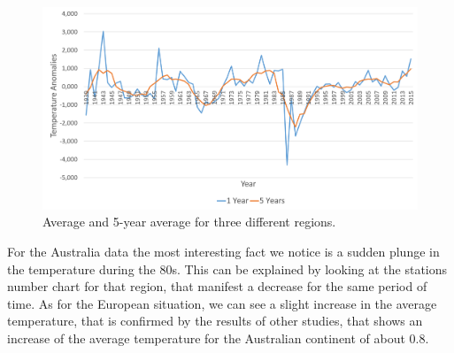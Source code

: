 \documentclass{vldb}
\begin{document}
\begin{figure}[tbh]
\includegraphics[width=1\linewidth]{AuAnomalies}
\caption{Average and 5-year average for three different regions.}
\label{fig:AuAnomalies}
\end{figure}

For the Australia data the most interesting fact we notice is a sudden plunge in the temperature during the 80s. This can be explained by looking at the stations number chart for that region, that manifest a decrease for the same period of time. As for the European situation, we can see a slight increase in the average temperature, that is confirmed by the results of other studies, that shows an increase of the average temperature for the Australian continent of about 0.8\degree. 
\end{document}
